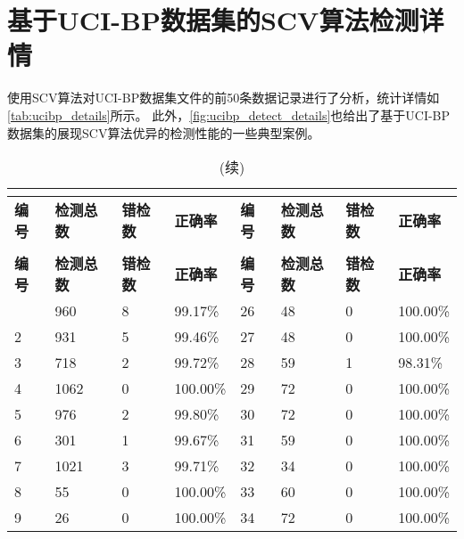 {\section{基于UCI-BP数据集的SCV算法检测详情}
使用SCV算法对UCI-BP数据集文件的前50条数据记录进行了分析，统计详情如\autoref{tab:ucibp_details}所示。
此外，\autoref{fig:ucibp_detect_details}也给出了基于UCI-BP数据集的展现SCV算法优异的检测性能的一些典型案例。
\begin{center}
    \begin{longtable}{m{1.5cm}<{\centering}m{1.5cm}<{\centering}m{1.5cm}<{\centering}m{1.5cm}<{\centering}m{1.5cm}<{\centering}m{1.5cm}<{\centering}m{1.5cm}<{\centering}m{1.5cm}<{\centering}} 
        \caption{基于UCI-BP数据库的SCV算法检测效果统计}\\
		\label{tab:ucibp_details}\\
        \toprule
        \textbf{编号} & \textbf{检测总数} & \textbf{错检数} & \textbf{正确率} & \textbf{编号} & \textbf{检测总数} & \textbf{错检数} & \textbf{正确率}  \\
        \midrule
        \endfirsthead
        \caption[]{(续)}\\
        \toprule
        \textbf{编号} & \textbf{检测总数} & \textbf{错检数} & \textbf{正确率} & \textbf{编号} & \textbf{检测总数} & \textbf{错检数} & \textbf{正确率}  \\
        \midrule
        \endhead 
        \bottomrule
        \endfoot
        \bottomrule
        \endlastfoot
        1	&   960 	&8	    &99.17\%	    &26	    &   48	 &0	    &100.00\%   \\
        2	&   931 	&5	    &99.46\%	    &27	    &   48	 &0	    &100.00\%   \\
        3	&   718 	&2	    &99.72\%	    &28	    &   59	 &1	    &98.31\%    \\    
        4	&   1062	&0	    &100.00\% 	    &29     &	72   &0     &100.00\%   \\
        5	&   976 	&2	    &99.80\%	    &30	    &   72	 &0	    &100.00\%   \\
        6	&   301 	&1	    &99.67\%	    &31	    &   59	 &0	    &100.00\%   \\
        7	&   1021	&3	    &99.71\%	    &32	    &   34	 &0	    &100.00\%   \\
        8	&   55	    &0	    &100.00\% 	    &33     &	60   &0     &100.00\%   \\
        9	&   26	    &0	    &100.00\% 	    &34     &	72   &0     &100.00\%   \\

\end{longtable}
\end{center}}

